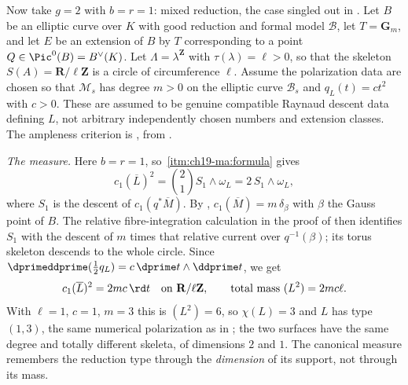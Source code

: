 \begin{example}
\label{ex:ch19-abelian-surface-mixed}
Now take $g=2$ with $b=r=1$: mixed reduction, the case singled out in
.  Let $B$ be an elliptic curve over
$K$ with good reduction and formal model $\mathcal B$, let
$T=\mathbf G_m$, and let $E$ be an extension of $B$ by $T$
corresponding to a point $Q\in\Pic^0(B)=B^\vee(K)$.  Let
$\Lambda=\lambda^{\mathbf Z}$ with $\tau(\lambda)=\ell>0$, so that the
skeleton $S(A)=\mathbf R/\ell\mathbf Z$ is a circle of circumference
$\ell$.  Assume the polarization data are chosen so that
$\mathcal M_s$ has degree $m>0$ on the elliptic curve $\mathcal B_s$
and $q_L(t)=ct^2$ with $c>0$.  These are assumed to be genuine compatible
Raynaud descent data defining $L$, not arbitrary independently chosen
numbers and extension classes.  The ampleness criterion is
, from
\cite[Theorem~B.6.4 and Remark~B.6.6]{CLD25}.

\emph{The measure.}  Here $b=r=1$, so
\,\cref{itm:ch19-ma:formula} gives
\[
 c_1(\overline L)^2=\binom21S_1\wedge\omega_L=2\,S_1\wedge\omega_L,
\]
where $S_1$ is the descent of $c_1(q^*\overline M)$.  By
, $c_1(\overline M)=m\,\delta_\beta$
with $\beta$ the Gauss point of $B$.  The relative fibre-integration
calculation in the proof of  then identifies
$S_1$ with the descent of $m$ times that relative current over
$q^{-1}(\beta)$; its torus skeleton descends to the whole circle.  Since
$\dprimeddprime(\tfrac12q_L)=c\,\dprime t\wedge\ddprime t$, we get
\[
 c_1(\overline L)^2=2mc\,\rd t
 \quad\text{on }\mathbf R/\ell\mathbf Z,
 \qquad\text{total mass }(L^2)=2mc\ell .
\]
With $\ell=1$, $c=1$, $m=3$ this is $(L^2)=6$, so $\chi(L)=3$ and
$L$ has type $(1,3)$, the same numerical polarization as in
; the two surfaces have the same
degree and totally different skeleta, of dimensions $2$ and $1$.  The
canonical measure remembers the reduction type through the \emph{dimension}
of its support, not through its mass.


\end{example}
